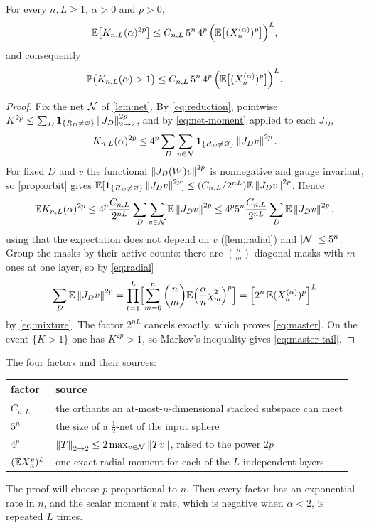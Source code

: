\begin{proposition}\label{prop:master}
For every $n,L\ge 1$, $\alpha>0$ and $p>0$,
\begin{equation}\label{eq:master}
\mathbb{E}\bigl[K_{n,L}(\alpha)^{2p}\bigr]\le C_{n,L}\,5^n\,4^p\,\Bigl(\mathbb{E}\bigl[(X_n^{(\alpha)})^p\bigr]\Bigr)^L,
\end{equation}
and consequently
\begin{equation}\label{eq:master-tail}
\mathbb{P}\bigl(K_{n,L}(\alpha)>1\bigr)\le C_{n,L}\,5^n\,4^p\,\Bigl(\mathbb{E}\bigl[(X_n^{(\alpha)})^p\bigr]\Bigr)^L .
\end{equation}
\end{proposition}

\begin{proof}
Fix the net $\mathcal{N}$ of \cref{lem:net}. By \cref{eq:reduction}, pointwise $K^{2p}\le\sum_D\mathbf{1}_{\{R_D\ne\varnothing\}}\left\lVert J_D\right\rVert_{2\to 2}^{2p}$, and by \cref{eq:net-moment} applied to each $J_D$,
\[
K_{n,L}(\alpha)^{2p}\le 4^p\sum_D\sum_{v\in\mathcal{N}}\mathbf{1}_{\{R_D\ne\varnothing\}}\left\lVert J_Dv\right\rVert^{2p}.
\]
For fixed $D$ and $v$ the functional $\left\lVert J_D(W)v\right\rVert^{2p}$ is nonnegative and gauge invariant, so \cref{prop:orbit} gives $\mathbb{E}[\mathbf{1}_{\{R_D\ne\varnothing\}}\left\lVert J_Dv\right\rVert^{2p}]\le(C_{n,L}/2^{nL})\mathbb{E}\left\lVert J_Dv\right\rVert^{2p}$. Hence
\[
\mathbb{E} K_{n,L}(\alpha)^{2p}\le 4^p\frac{C_{n,L}}{2^{nL}}\sum_D\sum_{v\in\mathcal{N}}\mathbb{E}\left\lVert J_Dv\right\rVert^{2p}\le 4^p5^n\frac{C_{n,L}}{2^{nL}}\sum_D\mathbb{E}\left\lVert J_Dv\right\rVert^{2p},
\]
using that the expectation does not depend on $v$ (\cref{lem:radial}) and $\left\lvert \mathcal{N}\right\rvert\le 5^n$. Group the masks by their active counts: there are $\binom nm$ diagonal masks with $m$ ones at one layer, so by \cref{eq:radial}
\[
\sum_D\mathbb{E}\left\lVert J_Dv\right\rVert^{2p}=\prod_{\ell=1}^L\Bigl[\sum_{m=0}^n\binom nm\mathbb{E}\Bigl(\frac\alpha n\chi^2_m\Bigr)^p\Bigr]=\Bigl[2^n\,\mathbb{E}(X_n^{(\alpha)})^p\Bigr]^L
\]
by \cref{eq:mixture}. The factor $2^{nL}$ cancels exactly, which proves \cref{eq:master}. On the event $\{K>1\}$ one has $K^{2p}>1$, so Markov's inequality gives \cref{eq:master-tail}.
\end{proof}

The four factors and their sources:
\begin{center}
\begin{tabular}{ll}
\toprule
factor & source\\
\midrule
$C_{n,L}$ & the orthants an at-most-$n$-dimensional stacked subspace can meet\\
$5^n$ & the size of a $\tfrac12$-net of the input sphere\\
$4^p$ & $\left\lVert T\right\rVert_{2\to 2}\le 2\max_{v\in\mathcal{N}}\left\lVert Tv\right\rVert$, raised to the power $2p$\\
$(\mathbb{E} X_n^p)^L$ & one exact radial moment for each of the $L$ independent layers\\
\bottomrule
\end{tabular}
\end{center}
The proof will choose $p$ proportional to $n$. Then every factor has an exponential rate in $n$, and the scalar moment's rate, which is negative when $\alpha<2$, is repeated $L$ times.

